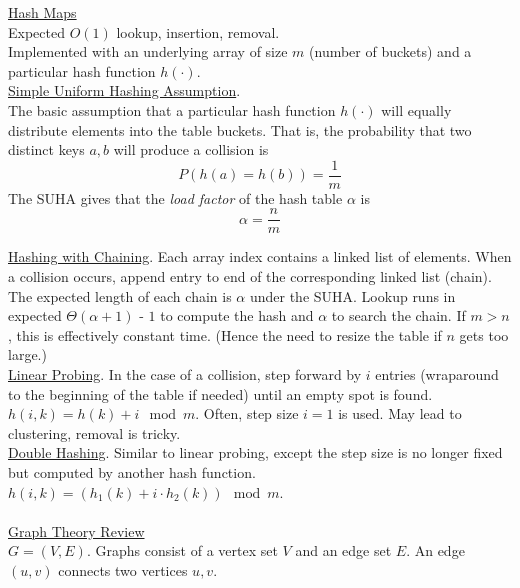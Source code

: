 \documentclass[12pt, fleqn]{general}
\begin{document}
    \begin{multicols*}{2}

    {\large \underline{Hash Maps}}\\

    Expected $O(1)$ lookup, insertion, removal.\\

    Implemented with an underlying array of size $m$ (number of buckets) and a particular hash function $h(\cdot)$.\\

    \underline{Simple Uniform Hashing Assumption}.\\ The basic assumption that a particular hash function $h(\cdot)$ will equally distribute elements into the table buckets. That is, the probability that two distinct keys $a, b$ will produce a collision is $$P(h(a) = h(b)) = \frac{1}{m}$$
    The SUHA gives that the \emph{load factor} of the hash table $\alpha$ is $$\alpha = \frac{n}{m}$$

    \underline{Hashing with Chaining}. Each array index contains a linked list of elements. When a collision occurs, append entry to end of the corresponding linked list (chain). The expected length of each chain is $\alpha$ under the SUHA. Lookup runs in expected $\Theta(\alpha + 1)$ - $1$ to compute the hash and $\alpha$ to search the chain. If $m > n$, this is effectively constant time. (Hence the need to resize the table if $n$ gets too large.)\\

    \underline{Linear Probing}. In the case of a collision, step forward by $i$ entries (wraparound to the beginning of the table if needed) until an empty spot is found. $h(i, k) = h(k) + i\mod m$. Often, step size $i=1$ is used. May lead to clustering, removal is tricky.\\

    \underline{Double Hashing}. Similar to linear probing, except the step size is no longer fixed but computed by another hash function. $h(i,k) = (h_1(k) + i\cdot h_2(k)) \mod m$.\\\\

    {\large \underline{Graph Theory Review}}\\
    
    $G = (V, E)$. Graphs consist of a vertex set $V$ and an edge set $E$. An edge $(u, v)$ connects two vertices $u, v$.\\


\end{multicols*}
\end{document}
